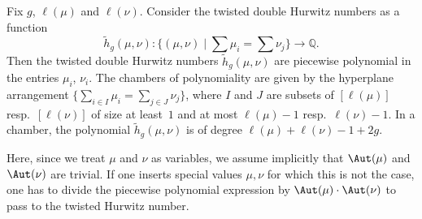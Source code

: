 \begin{theo}\label{thm-PP}
Fix $g$, $\ell(\mu)$ and $\ell(\nu)$. Consider the twisted double Hurwitz numbers as a function 
$$\tilde{h}_g(\mu,\nu):\Big\{(\mu,\nu) \mid \sum \mu_i=\sum\nu_j\Big\} \longrightarrow\mathbb{Q}.$$ 
Then the twisted double Hurwitz numbers $\tilde{h}_g(\mu,\nu)$ are piecewise polynomial in the entries $\mu_i$, $\nu_i$. 
The chambers of polynomiality are given by the hyperplane arrangement $\{\sum_{i\in I}\mu_i=\sum_{j\in J}\nu_j\}$, where $I$ and $J$ are subsets of $[\ell(\mu)]$ resp.\ $[\ell(\nu)]$ of size at least~$1$ and at most $\ell(\mu)-1$ resp.\ $\ell(\nu)-1$.
In a chamber, the polynomial $\tilde{h}_g(\mu,\nu)$ is of degree $\ell(\mu)+\ell(\nu)-1+2g$. 
\end{theo}

Here, since we treat $\mu$ and $\nu$ as variables, we assume implicitly that $\Aut(\mu)$ and $\Aut(\nu)$ are trivial. If one inserts special values $\mu,\nu$ for which this is not the case, one has to divide the piecewise polynomial expression by $\Aut(\mu)\cdot \Aut(\nu)$ to pass to the twisted Hurwitz number.

